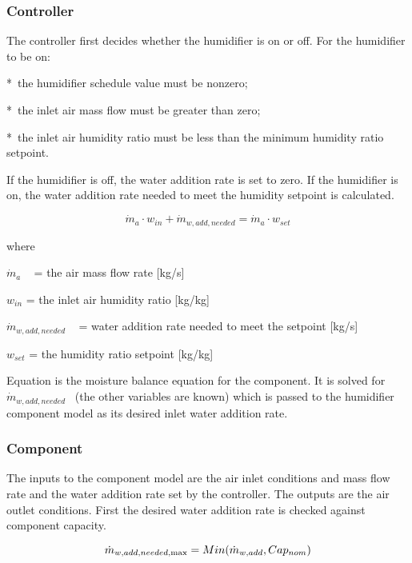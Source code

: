 \subsubsection{Controller}\label{controller}

The controller first decides whether the humidifier is on or off. For the humidifier to be on:

*~the humidifier schedule value must be nonzero;

*~the inlet air mass flow must be greater than zero;

*~the inlet air humidity ratio must be less than the minimum humidity ratio setpoint.

If the humidifier is off, the water addition rate is set to zero. If the humidifier is on, the water addition rate needed to meet the humidity setpoint is calculated.

\begin{equation}
{\dot m_a} \cdot {w_{in}} + {\dot m_{w,add,needed}} = {\dot m_a} \cdot {w_{set}}
\end{equation}

where

\({\dot m_a}\) ~ = the air mass flow rate {[}kg/s{]}

\({w_{in}}\) = the inlet air humidity ratio {[}kg/kg{]}

\({\dot m_{w,add,needed}}\) ~ = water addition rate needed to meet the setpoint {[}kg/s{]}

\({w_{set}}\) = the humidity ratio setpoint {[}kg/kg{]}

Equation is the moisture balance equation for the component. It is solved for \({\dot m_{w,add,needed}}\) ~(the other variables are known) which is passed to the humidifier component model as its desired inlet water addition rate.

\subsubsection{Component}\label{component}

The inputs to the component model are the air inlet conditions and mass flow rate and the water addition rate set by the controller. The outputs are the air outlet conditions. First the desired water addition rate is checked against component capacity.

\begin{equation}
{\dot m_{w,add,needed,{\rm{max}}}} = Min({\dot m_{w,add}},Ca{p_{nom}})
\end{equation}

